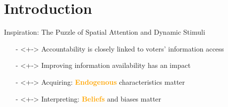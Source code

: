 \section{Introduction}
\frame{\sectionpage}
\begin{frame}{Inspiration: The Puzzle of Spatial Attention and Dynamic Stimuli}
     
    
    
    
    \begin{itemize}
        \item[-]<+-> Accountability is closely linked to voters' information access {\scriptsize \citep{przeworski1999democracy}}
        \item[-]<+-> Improving information availability has an impact {\scriptsize \citep{alesina2007bureaucrats,besley2006handcuffs,majumdar2004politics,persson2000political}}
    \end{itemize}
    
    \vspace{10pt}
    \begin{itemize}
        \item[-]<+-> Acquiring: \textcolor<8>{orange}{\textbf<8>{Endogenous}} characteristics matter {\scriptsize \citep{downs1957economic}}
        \item[-]<+-> Interpreting: \textcolor<8>{orange}{\textbf<8>{Beliefs}} and biases matter {\scriptsize \citep{rabin1998psychology}} 
    \end{itemize}
    
\end{frame}


